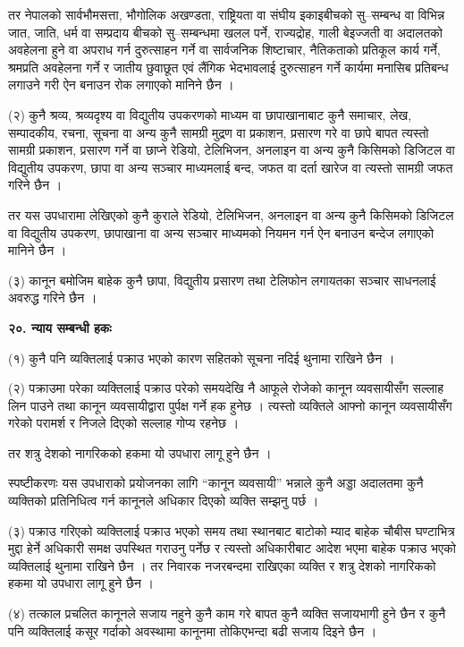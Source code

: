 तर नेपालको सार्वभौमसत्ता, भौगोलिक अखण्डता, राष्ट्रियता वा संघीय इकाइबीचको सु–सम्बन्ध वा विभिन्न जात, जाति, धर्म वा सम्प्रदाय बीचको सु–सम्बन्धमा खलल पर्ने, राज्यद्रोह, गाली बेइज्जती वा अदालतको अवहेलना हुने वा अपराध गर्न दुरुत्साहन गर्ने वा सार्वजनिक शिष्टाचार, नैतिकताको प्रतिकूल कार्य गर्ने, श्रमप्रति अवहेलना गर्ने र जातीय छुवाछूत एवं लैंगिक भेदभावलाई दुरुत्साहन गर्ने कार्यमा मनासिब प्रतिबन्ध लगाउने गरी ऐन बनाउन रोक लगाएको मानिने छैन ।

(२) कुनै श्रव्य, श्रव्यदृश्य वा विद्युतीय उपकरणको माध्यम वा छापाखानाबाट कुनै समाचार, लेख, सम्पादकीय, रचना, सूचना वा अन्य कुनै सामग्री मुद्रण वा प्रकाशन, प्रसारण गरे वा छापे बापत त्यस्तो सामग्री प्रकाशन, प्रसारण गर्ने वा छाप्ने रेडियो, टेलिभिजन, अनलाइन वा अन्य कुनै किसिमको डिजिटल वा विद्युतीय उपकरण, छापा वा अन्य सञ्चार माध्यमलाई बन्द, जफत वा दर्ता खारेज वा त्यस्तो सामग्री जफत गरिने छैन ।

तर यस उपधारामा लेखिएको कुनै कुराले रेडियो, टेलिभिजन, अनलाइन वा अन्य कुनै किसिमको डिजिटल वा विद्युतीय उपकरण, छापाखाना वा अन्य सञ्चार माध्यमको नियमन गर्न ऐन बनाउन बन्देज लगाएको मानिने छैन ।

(३) कानून बमोजिम बाहेक कुनै छापा, विद्युतीय प्रसारण तथा टेलिफोन लगायतका सञ्चार साधनलाई अवरुद्ध गरिने छैन ।

\textbf{२०. न्याय सम्बन्धी हकः}

(१) कुनै पनि व्यक्तिलाई पक्राउ भएको कारण सहितको सूचना नदिई थुनामा राखिने छैन ।

(२) पक्राउमा परेका व्यक्तिलाई पक्राउ परेको समयदेखि नै आफूले रोजेको कानून व्यवसायीसँग सल्लाह लिन पाउने तथा कानून व्यवसायीद्वारा पुर्पक्ष गर्ने हक हुनेछ । त्यस्तो व्यक्तिले आफ्नो कानून व्यवसायीसँग गरेको परामर्श र निजले दिएको सल्लाह गोप्य रहनेछ ।

तर शत्रु देशको नागरिकको हकमा यो उपधारा लागू हुने छैन ।

स्पष्टीकरणः यस उपधाराको प्रयोजनका लागि “कानून व्यवसायी” भन्नाले कुनै अड्डा अदालतमा कुनै व्यक्तिको प्रतिनिधित्व गर्न कानूनले अधिकार दिएको व्यक्ति सम्झनु पर्छ ।

(३) पक्राउ गरिएको व्यक्तिलाई पक्राउ भएको समय तथा स्थानबाट बाटोको म्याद बाहेक चौबीस घण्टाभित्र मुद्दा हेर्ने अधिकारी समक्ष उपस्थित गराउनु पर्नेछ र त्यस्तो अधिकारीबाट आदेश भएमा बाहेक पक्राउ भएको व्यक्तिलाई थुनामा राखिने छैन । तर निवारक नजरबन्दमा राखिएका व्यक्ति र शत्रु देशको नागरिकको हकमा यो उपधारा लागू हुने छैन ।

(४) तत्काल प्रचलित कानूनले सजाय नहुने कुनै काम गरे बापत कुनै व्यक्ति सजायभागी हुने छैन र कुनै पनि व्यक्तिलाई कसूर गर्दाको अवस्थामा कानूनमा तोकिएभन्दा बढी सजाय दिइने छैन ।

